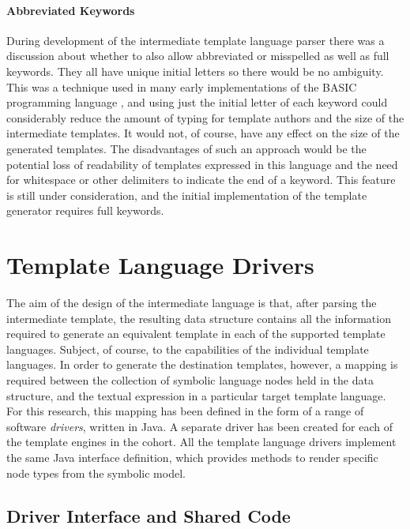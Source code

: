 \paragraph{Abbreviated Keywords}

During development of the intermediate template language parser there was a discussion about whether to also allow abbreviated or misspelled as well as full keywords. They all have unique initial letters so there would be no ambiguity. This was a technique used in many early implementations of the BASIC programming language \citep{Kurtz1978}, and using just the initial letter of each keyword could considerably reduce the amount of typing for template authors and the size of the intermediate templates. It would not, of course, have any effect on the size of the generated templates. The disadvantages of such an approach would be the potential loss of readability of templates expressed in this language and the need for whitespace or other delimiters to indicate the end of a keyword. This feature is still under consideration, and the initial implementation of the template generator requires full keywords.

\section*{Template Language Drivers}
\label{gilt:drivers}

The aim of the design of the intermediate language is that, after parsing the intermediate template, the resulting data structure contains all the information required to generate an equivalent template in each of the supported template languages. Subject, of course, to the capabilities of the individual template languages. In order to generate the destination templates, however, a mapping is required between the collection of symbolic language nodes held in the data structure, and the textual expression in a particular target template language. For this research, this mapping has been defined in the form of a range of software \emph{drivers}, written in Java. A separate driver has been created for each of the template engines in the cohort. All the template language drivers implement the same Java interface definition, which provides methods to render specific node types from the symbolic model.

\subsection*{Driver Interface and Shared Code}

